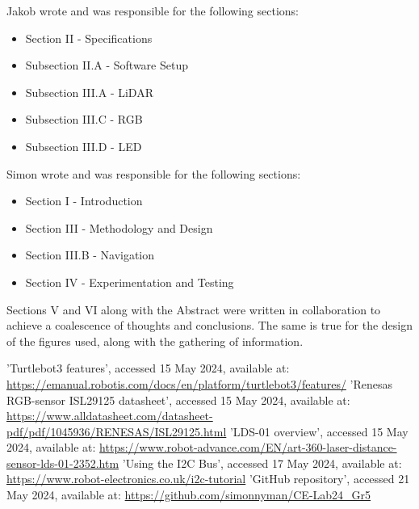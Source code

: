 \documentclass[conference]{IEEEtran}
\begin{document}
Jakob wrote and was responsible for the following sections:
\begin{itemize}
    \item Section II - Specifications
    \item Subsection II.A - Software Setup
    \item Subsection III.A - LiDAR
    \item Subsection III.C - RGB
    \item Subsection III.D - LED
\end{itemize}

Simon wrote and was responsible for the following sections:
\begin{itemize}
    \item Section I - Introduction
    \item Section III - Methodology and Design
    \item Section III.B - Navigation
    \item Section IV - Experimentation and Testing
\end{itemize}

Sections V and VI along with the Abstract were written in collaboration to achieve a coalescence of thoughts and conclusions.
The same is true for the design of the figures used, along with the gathering of information.
\begin{thebibliography}{00}
 'Turtlebot3 features', accessed 15 May 2024, available at: \url{https://emanual.robotis.com/docs/en/platform/turtlebot3/features/}
 'Renesas RGB-sensor ISL29125 datasheet', accessed 15 May 2024, available at: \url{https://www.alldatasheet.com/datasheet-pdf/pdf/1045936/RENESAS/ISL29125.html}
 'LDS-01 overview', accessed 15 May 2024, available at: \url{https://www.robot-advance.com/EN/art-360-laser-distance-sensor-lds-01-2352.htm}
 'Using the I2C Bus', accessed 17 May 2024, available at: \url{https://www.robot-electronics.co.uk/i2c-tutorial}
 'GitHub repository', accessed 21 May 2024, available at: \url{https://github.com/simonnyman/CE-Lab24_Gr5}
\end{thebibliography}
\end{document}

